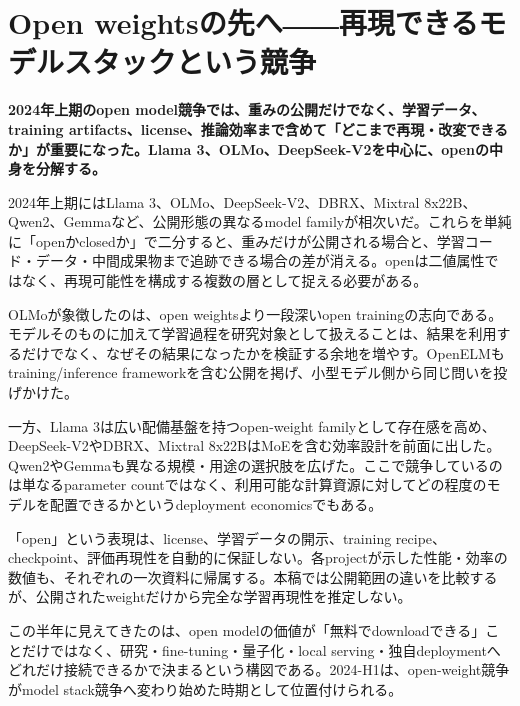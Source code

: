 \section{Open weightsの先へ――再現できるモデルスタックという競争}
\noindent\textbf{2024年上期のopen model競争では、重みの公開だけでなく、学習データ、training artifacts、license、推論効率まで含めて「どこまで再現・改変できるか」が重要になった。Llama 3、OLMo、DeepSeek-V2を中心に、openの中身を分解する。}\autocite{src-3d2fa83e273d,src-d9d69089eb6a,src-f9616f30e8f5}

2024年上期にはLlama 3、OLMo、DeepSeek-V2、DBRX、Mixtral 8x22B、Qwen2、Gemmaなど、公開形態の異なるmodel familyが相次いだ。これらを単純に「openかclosedか」で二分すると、重みだけが公開される場合と、学習コード・データ・中間成果物まで追跡できる場合の差が消える。openは二値属性ではなく、再現可能性を構成する複数の層として捉える必要がある。\autocite{src-0395647db4a8,src-05f98c47f3e8,src-3d2fa83e273d,src-461ae12066d1,src-d9d69089eb6a,src-f9616f30e8f5,src-ff36b1c2ef30}


OLMoが象徴したのは、open weightsより一段深いopen trainingの志向である。モデルそのものに加えて学習過程を研究対象として扱えることは、結果を利用するだけでなく、なぜその結果になったかを検証する余地を増やす。OpenELMもtraining/inference frameworkを含む公開を掲げ、小型モデル側から同じ問いを投げかけた。\autocite{src-3d2fa83e273d,src-4d404eabda6e}


一方、Llama 3は広い配備基盤を持つopen-weight familyとして存在感を高め、DeepSeek-V2やDBRX、Mixtral 8x22BはMoEを含む効率設計を前面に出した。Qwen2やGemmaも異なる規模・用途の選択肢を広げた。ここで競争しているのは単なるparameter countではなく、利用可能な計算資源に対してどの程度のモデルを配置できるかというdeployment economicsでもある。\autocite{src-0395647db4a8,src-05f98c47f3e8,src-461ae12066d1,src-d9d69089eb6a,src-f9616f30e8f5,src-ff36b1c2ef30}


\begin{claimboundary}
「open」という表現は、license、学習データの開示、training recipe、checkpoint、評価再現性を自動的に保証しない。各projectが示した性能・効率の数値も、それぞれの一次資料に帰属する。本稿では公開範囲の違いを比較するが、公開されたweightだけから完全な学習再現性を推定しない。\autocite{src-37f17fc6592f,src-3d2fa83e273d,src-8ccec4bc715c,src-d9d69089eb6a,src-f9616f30e8f5}
\end{claimboundary}

この半年に見えてきたのは、open modelの価値が「無料でdownloadできる」ことだけではなく、研究・fine-tuning・量子化・local serving・独自deploymentへどれだけ接続できるかで決まるという構図である。2024-H1は、open-weight競争がmodel stack競争へ変わり始めた時期として位置付けられる。\autocite{src-3d2fa83e273d,src-4d404eabda6e,src-d9d69089eb6a,src-f9616f30e8f5}
